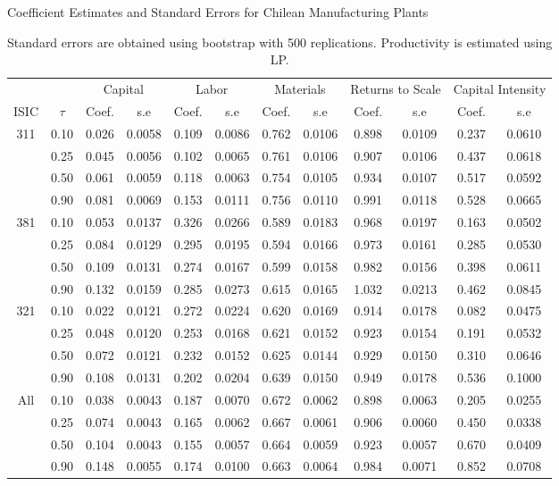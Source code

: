 \documentclass[11pt]{article}
\begin{document}
\begin{table}[H]
\centering
\caption{Coefficient Estimates and Standard Errors for Chilean Manufacturing Plants}
\begin{tabular}{cccccccccccc}
  \hline\hline & & \multicolumn{2}{c}{Capital}  & \multicolumn{2}{c}{Labor} & \multicolumn{2}{c}{Materials} & \multicolumn{2}{c}{Returns to Scale} & \multicolumn{2}{c}{Capital Intensity}\\ \cmidrule(lr){3-4} \cmidrule(lr){5-6} \cmidrule(lr){7-8} \cmidrule(lr){9-10} \cmidrule(lr){11-12}ISIC & $\tau$ & Coef. & s.e & Coef. & s.e & Coef. & s.e & Coef. & s.e & Coef. & s.e \\ 
  \hline
311 & 0.10 & 0.026 & 0.0058 & 0.109 & 0.0086 & 0.762 & 0.0106 & 0.898 & 0.0109 & 0.237 & 0.0610 \\ 
   & 0.25 & 0.045 & 0.0056 & 0.102 & 0.0065 & 0.761 & 0.0106 & 0.907 & 0.0106 & 0.437 & 0.0618 \\ 
   & 0.50 & 0.061 & 0.0059 & 0.118 & 0.0063 & 0.754 & 0.0105 & 0.934 & 0.0107 & 0.517 & 0.0592 \\ 
   & 0.90 & 0.081 & 0.0069 & 0.153 & 0.0111 & 0.756 & 0.0110 & 0.991 & 0.0118 & 0.528 & 0.0665 \\ 
  381 & 0.10 & 0.053 & 0.0137 & 0.326 & 0.0266 & 0.589 & 0.0183 & 0.968 & 0.0197 & 0.163 & 0.0502 \\ 
   & 0.25 & 0.084 & 0.0129 & 0.295 & 0.0195 & 0.594 & 0.0166 & 0.973 & 0.0161 & 0.285 & 0.0530 \\ 
   & 0.50 & 0.109 & 0.0131 & 0.274 & 0.0167 & 0.599 & 0.0158 & 0.982 & 0.0156 & 0.398 & 0.0611 \\ 
   & 0.90 & 0.132 & 0.0159 & 0.285 & 0.0273 & 0.615 & 0.0165 & 1.032 & 0.0213 & 0.462 & 0.0845 \\ 
  321 & 0.10 & 0.022 & 0.0121 & 0.272 & 0.0224 & 0.620 & 0.0169 & 0.914 & 0.0178 & 0.082 & 0.0475 \\ 
   & 0.25 & 0.048 & 0.0120 & 0.253 & 0.0168 & 0.621 & 0.0152 & 0.923 & 0.0154 & 0.191 & 0.0532 \\ 
   & 0.50 & 0.072 & 0.0121 & 0.232 & 0.0152 & 0.625 & 0.0144 & 0.929 & 0.0150 & 0.310 & 0.0646 \\ 
   & 0.90 & 0.108 & 0.0131 & 0.202 & 0.0204 & 0.639 & 0.0150 & 0.949 & 0.0178 & 0.536 & 0.1000 \\ 
  All & 0.10 & 0.038 & 0.0043 & 0.187 & 0.0070 & 0.672 & 0.0062 & 0.898 & 0.0063 & 0.205 & 0.0255 \\ 
   & 0.25 & 0.074 & 0.0043 & 0.165 & 0.0062 & 0.667 & 0.0061 & 0.906 & 0.0060 & 0.450 & 0.0338 \\ 
   & 0.50 & 0.104 & 0.0043 & 0.155 & 0.0057 & 0.664 & 0.0059 & 0.923 & 0.0057 & 0.670 & 0.0409 \\ 
   & 0.90 & 0.148 & 0.0055 & 0.174 & 0.0100 & 0.663 & 0.0064 & 0.984 & 0.0071 & 0.852 & 0.0708 \\ 
   \hline
\end{tabular}
\caption*{\footnotesize Standard errors are obtained using bootstrap with 500 replications. Productivity is estimated using LP.}
\label{CHLestLP}
\end{table}
\end{document}
